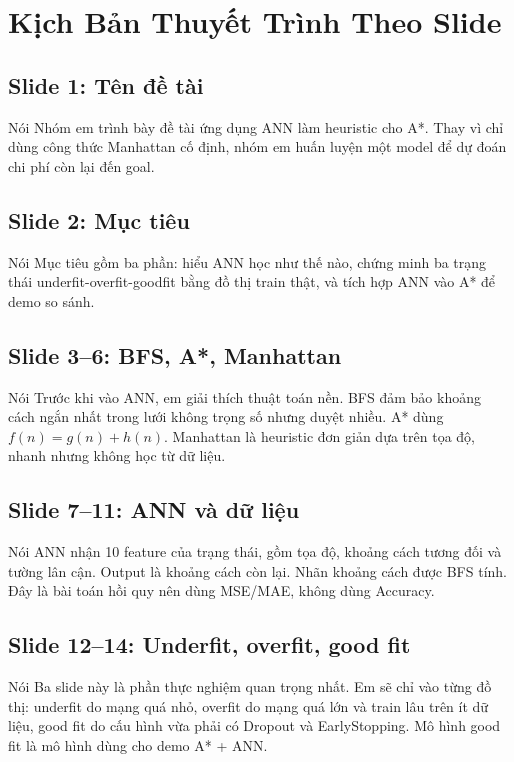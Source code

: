 \documentclass[12pt,a4paper]{article}
\begin{document}
\section{Kịch Bản Thuyết Trình Theo Slide}

\subsection*{Slide 1: Tên đề tài}
\begin{saybox}{Nói}
Nhóm em trình bày đề tài ứng dụng ANN làm heuristic cho A*. Thay vì chỉ dùng công thức Manhattan cố định, nhóm em huấn luyện một model để dự đoán chi phí còn lại đến goal.
\end{saybox}

\subsection*{Slide 2: Mục tiêu}
\begin{saybox}{Nói}
Mục tiêu gồm ba phần: hiểu ANN học như thế nào, chứng minh ba trạng thái underfit-overfit-goodfit bằng đồ thị train thật, và tích hợp ANN vào A* để demo so sánh.
\end{saybox}

\subsection*{Slide 3--6: BFS, A*, Manhattan}
\begin{saybox}{Nói}
Trước khi vào ANN, em giải thích thuật toán nền. BFS đảm bảo khoảng cách ngắn nhất trong lưới không trọng số nhưng duyệt nhiều. A* dùng \(f(n)=g(n)+h(n)\). Manhattan là heuristic đơn giản dựa trên tọa độ, nhanh nhưng không học từ dữ liệu.
\end{saybox}

\subsection*{Slide 7--11: ANN và dữ liệu}
\begin{saybox}{Nói}
ANN nhận 10 feature của trạng thái, gồm tọa độ, khoảng cách tương đối và tường lân cận. Output là khoảng cách còn lại. Nhãn khoảng cách được BFS tính. Đây là bài toán hồi quy nên dùng MSE/MAE, không dùng Accuracy.
\end{saybox}

\subsection*{Slide 12--14: Underfit, overfit, good fit}
\begin{saybox}{Nói}
Ba slide này là phần thực nghiệm quan trọng nhất. Em sẽ chỉ vào từng đồ thị: underfit do mạng quá nhỏ, overfit do mạng quá lớn và train lâu trên ít dữ liệu, good fit do cấu hình vừa phải có Dropout và EarlyStopping. Mô hình good fit là mô hình dùng cho demo A* + ANN.
\end{saybox}
\end{document}
